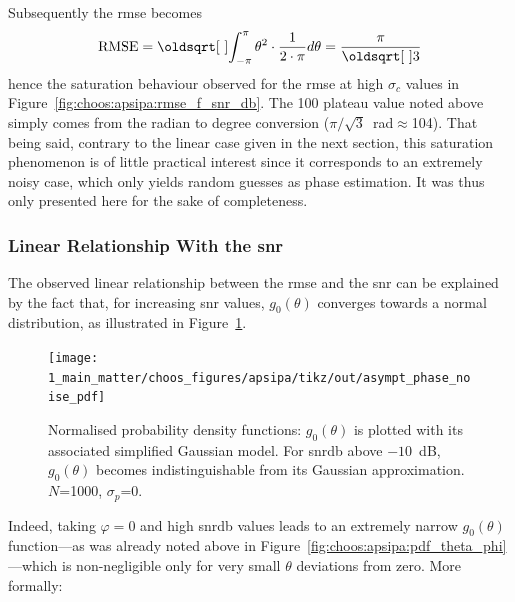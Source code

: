 Subsequently the \gls{rmse} becomes
\begin{equation}
	\text{RMSE} = \sqrt{\int_{-\pi}^{\pi} \theta^2 \cdot 	\frac{1}{2 \cdot \pi} d\theta}\\
	= \frac{\pi}{\sqrt{3}}
\end{equation}
hence the saturation behaviour observed for the \gls{rmse} at high $\sigma_c$ values in Figure~\ref{fig:choos:apsipa:rmse_f_snr_db}. The 100{\degree} plateau value noted above simply comes from the radian to degree conversion ($\pi/\sqrt{3}$~rad$\approx$104{\degree}). That being said, contrary to the linear case given in the next section, this saturation phenomenon is of little practical interest since it corresponds to an extremely noisy case, which only yields random guesses as phase estimation. It was thus only presented here for the sake of completeness.

\subsubsection{Linear Relationship With the \texorpdfstring{\gls{snr}}{SNR}}\label{subseq:choos:apsipa:linear_rel}

The observed linear relationship between the \gls{rmse} and the \gls{snr} can be explained by the fact that, for increasing \gls{snr} values, $g_0(\theta)$ converges towards a normal distribution, as illustrated in Figure~\ref{fig:choos:apsipa:asympt_linear_pdf}.

\begin{figure}
	\centering
	\texttt{[image: 1\_main\_matter/choos\_figures/apsipa/tikz/out/asympt\_phase\_noise\_pdf]}
	\caption{Normalised probability density functions: $g_0(\theta)$ is plotted with its associated simplified Gaussian model. For \gls{snrdb} above $-10$~dB, $g_0(\theta)$ becomes indistinguishable from its Gaussian approximation. $N$=1000, $\sigma_p$=0.}
	\label{fig:choos:apsipa:asympt_linear_pdf}
\end{figure}

Indeed, taking $\varphi=0$ and high \gls{snrdb} values leads to an extremely narrow $g_0(\theta)$ function---as was already noted above in Figure~\ref{fig:choos:apsipa:pdf_theta_phi}---which is non-negligible only for very small $\theta$ deviations from zero. More formally:

